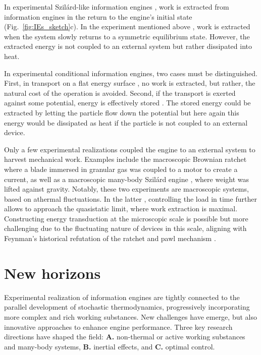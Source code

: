 \documentclass[aps, twocolumn,floatfix,showpacs, superscriptaddress]{revtex4-2}
\newcommand{\ie}{information engines }
\newcommand{\se}{Szil\'ard engine }
\begin{document}
In experimental Szil\'ard-like \ie, work is extracted from \ie in the return to the engine's initial state (Fig.~\ref{fig:IEs_sketch}c).
In the experiment mentioned above \cite{koski_experimental_2014, Ribezzi_Crivellari_2019,roldan_universal_2014}, work is extracted when the system slowly returns to a symmetric equilibrium state. However, the extracted energy is not coupled to an external system but rather dissipated into heat.

In experimental conditional information engines, two cases must be distinguished.
First, in transport on a flat energy surface \cite{lee_experimentally-achieved_2018}, no work is extracted, but rather, the natural cost of the operation is avoided.
Second, if the transport is exerted against some potential, energy is effectively stored \cite{toyabe_experimental_2010, admon_experimental_2018, saha2021maximizing}.
The stored energy could be extracted by letting the particle flow down the potential but here again this energy would be dissipated as heat if the particle is not coupled to an external device.


Only a few experimental realizations coupled the engine to an external system to harvest mechanical work. Examples include the macroscopic Brownian ratchet \cite{lagoin_human-scale_2022} where a blade immersed in granular gas was coupled to a motor to create a current, as well as a macroscopic many-body \se \cite{Chor2023}, where weight was lifted against gravity.
Notably, these two experiments are macroscopic systems, based on athermal fluctuations.
In the latter \cite{Chor2023}, controlling the load in time further allows to approach the quasistatic limit, where work extraction is maximal.
Constructing energy transduction at the microscopic scale is possible but more challenging due to the fluctuating nature of devices in this scale, aligning with Feynman's historical refutation of the ratchet and pawl mechanism \cite{feynman1965feynman, bang2018experimental}. 



\section{New horizons}
\label{Sec:NewHorizons}

Experimental realization of information engines are tightly connected to the parallel development of stochastic thermodynamics, progressively incorporating more complex and rich working substances.
New challenges have emerge, but also innovative approaches to enhance engine performance. Three key research directions have shaped the field: \textbf{A.} non-thermal or active working substances and many-body systems, \textbf{B.} inertial effects, and \textbf{C.} optimal control.
\end{document}
